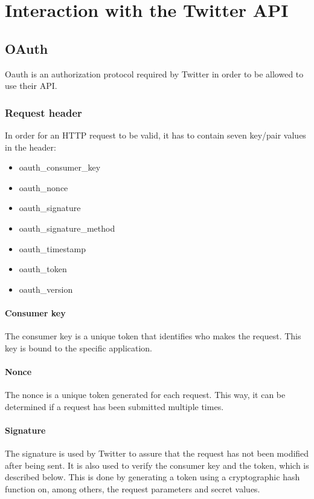 \chapter{Interaction with the Twitter \ac{API}}
\section{OAuth}
Oauth is an authorization protocol required by Twitter in order to be allowed to
use their \ac{API}. 

\subsection{Request header}
In order for an \ac{HTTP} request to be valid, it has to
contain seven key/pair values in the header:
\begin{itemize}
  \item oauth\_consumer\_key
  \item oauth\_nonce
  \item oauth\_signature
  \item oauth\_signature\_method
  \item oauth\_timestamp
  \item oauth\_token
  \item oauth\_version
\end{itemize}

\subsubsection*{Consumer key}
The consumer key is a unique token that identifies who makes the request.
This key is bound to the specific application.

\subsubsection*{Nonce}
The nonce is a unique token generated for each request. This way, it can be
determined if a request has been submitted multiple times. 

\subsubsection*{Signature}
The signature is used by Twitter to assure that the request has not been
modified after being sent. It is also used to verify the consumer key and the
token, which is described below.
This is done by generating a token using a cryptographic hash function on, among
others, the request parameters and secret values.

